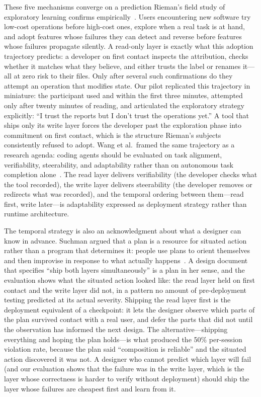These five mechanisms converge on a prediction Rieman's field study of
exploratory learning confirms empirically~\cite{rieman1996}. Users encountering
new software try low-cost operations before high-cost ones, explore when a real
task is at hand, and adopt features whose failures they can detect and reverse
before features whose failures propagate silently. A read-only layer is exactly
what this adoption trajectory predicts: a developer on first contact inspects
the attribution, checks whether it matches what they believe, and either trusts
the label or renames it---all at zero risk to their files. Only after several
such confirmations do they attempt an operation that modifies state. Our pilot
replicated this trajectory in miniature: the participant used 
and  within the first three minutes, attempted 
only after twenty minutes of reading, and articulated the exploratory strategy
explicitly: ``I trust the reports but I don't trust the operations yet.'' A
tool that ships only its write layer forces the developer past the exploration
phase into commitment on first contact, which is the structure Rieman's subjects
consistently refused to adopt. Wang et al.\ framed the same trajectory as a
research agenda: coding agents should be evaluated on task alignment,
verifiability, steerability, and adaptability rather than on autonomous task
completion alone~\cite{wang2026humansmissing}. The read layer delivers
verifiability (the developer checks what the tool recorded), the write layer
delivers steerability (the developer removes or redirects what was recorded), and
the temporal ordering between them---read first, write later---is adaptability
expressed as deployment strategy rather than runtime architecture.

The temporal strategy is also an acknowledgment about what a designer can know
in advance. Suchman argued that a plan is a resource for situated action rather
than a program that determines it: people use plans to orient themselves and then
improvise in response to what actually happens~\cite{suchman1987}. A design
document that specifies ``ship both layers simultaneously'' is a plan in her
sense, and the evaluation shows what the situated action looked like: the read
layer held on first contact and the write layer did not, in a pattern no amount
of pre-deployment testing predicted at its actual severity. Shipping the read
layer first is the deployment equivalent of a checkpoint: it lets the designer
observe which parts of the plan survived contact with a real user, and defer the
parts that did not until the observation has informed the next design. The
alternative---shipping everything and hoping the plan holds---is what produced
the 50\% per-session violation rate, because the plan said ``composition is
reliable'' and the situated action discovered it was not. A designer who cannot
predict which layer will fail (and our evaluation shows that the failure was in
the write layer, which is the layer whose correctness is harder to verify without
deployment) should ship the layer whose failures are cheapest first and learn
from it.

